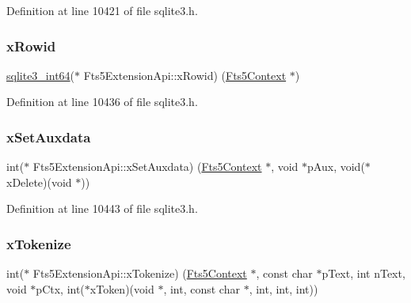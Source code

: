 Definition at line 10421 of file sqlite3.\+h.

\mbox{\label{struct_fts5_extension_api_acc4336c9f7bf39defa1acbdbf5df0020}} 
\subsubsection{\texorpdfstring{x\+Rowid}{xRowid}}
{\footnotesize\ttfamily \mbox{\hyperlink{sqlite3_8h_a0a4d3e6c1ad46f90e746b920ab6ca0d2}{sqlite3\+\_\+int64}}($\ast$ Fts5\+Extension\+Api\+::x\+Rowid) (\mbox{\hyperlink{sqlite3_8h_a97821b95ebebd43db901977ffd5b26bc}{Fts5\+Context}} $\ast$)}



Definition at line 10436 of file sqlite3.\+h.

\mbox{\label{struct_fts5_extension_api_a0f59a6c383a478ed95efdb7e4a95de80}} 
\subsubsection{\texorpdfstring{x\+Set\+Auxdata}{xSetAuxdata}}
{\footnotesize\ttfamily int($\ast$ Fts5\+Extension\+Api\+::x\+Set\+Auxdata) (\mbox{\hyperlink{sqlite3_8h_a97821b95ebebd43db901977ffd5b26bc}{Fts5\+Context}} $\ast$, void $\ast$p\+Aux, void($\ast$x\+Delete)(void $\ast$))}



Definition at line 10443 of file sqlite3.\+h.

\mbox{\label{struct_fts5_extension_api_a670af0d7715f69834376f8df187dcf30}} 
\subsubsection{\texorpdfstring{x\+Tokenize}{xTokenize}}
{\footnotesize\ttfamily int($\ast$ Fts5\+Extension\+Api\+::x\+Tokenize) (\mbox{\hyperlink{sqlite3_8h_a97821b95ebebd43db901977ffd5b26bc}{Fts5\+Context}} $\ast$, const char $\ast$p\+Text, int n\+Text, void $\ast$p\+Ctx, int($\ast$x\+Token)(void $\ast$, int, const char $\ast$, int, int, int))}



